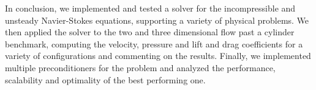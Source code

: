 In conclusion, we implemented and tested a solver for the incompressible and unsteady Navier-Stokes equations, supporting a variety of physical problems. We then applied the solver to the two and three dimensional flow past a cylinder benchmark, computing the velocity, pressure and lift and drag coefficients for a variety of configurations and commenting on the results. Finally, we implemented multiple preconditioners for the problem and analyzed the performance, scalability and optimality of the best performing one.